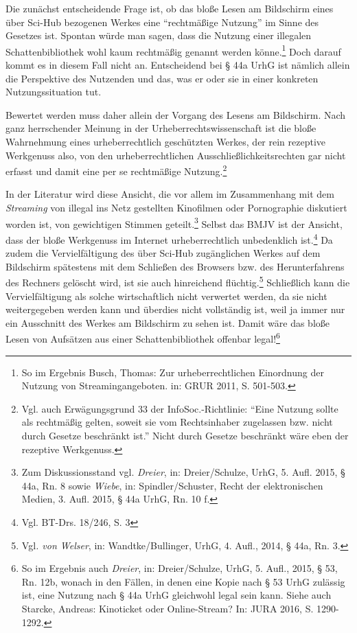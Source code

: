 \documentclass[a4paper,
fontsize=11pt,
oneside,
numbers=noperiodatend,
parskip=half-,
bibliography=totoc,
final
]{scrartcl}
\begin{document}
Die zunächst entscheidende Frage ist, ob das bloße Lesen am Bildschirm
eines über Sci-Hub bezogenen Werkes eine \enquote{rechtmäßige Nutzung}
im Sinne des Gesetzes ist. Spontan würde man sagen, dass die Nutzung
einer illegalen Schattenbibliothek wohl kaum rechtmäßig genannt werden
könne.\footnote{So im Ergebnis Busch, Thomas: Zur urheberrechtlichen
  Einordnung der Nutzung von Streamingangeboten. in: GRUR 2011, S.
  501-503.} Doch darauf kommt es in diesem Fall nicht an. Entscheidend
bei § 44a UrhG ist nämlich allein die Perspektive des Nutzenden und das,
was er oder sie in einer konkreten Nutzungssituation tut.

Bewertet werden muss daher allein der Vorgang des Lesens am Bildschirm.
Nach ganz herrschender Meinung in der Urheberrechtswissenschaft ist die
bloße Wahrnehmung eines urheberrechtlich geschützten Werkes, der rein
rezeptive Werkgenuss also, von den urheberrechtlichen
Ausschließlichkeitsrechten gar nicht erfasst und damit eine per se
rechtmäßige Nutzung.\footnote{Vgl. auch Erwägungsgrund 33 der
  InfoSoc.-Richtlinie: \enquote{Eine Nutzung sollte als rechtmäßig
  gelten, soweit sie vom Rechtsinhaber zugelassen bzw. nicht durch
  Gesetze beschränkt ist.} Nicht durch Gesetze beschränkt wäre eben der
  rezeptive Werkgenuss.}

In der Literatur wird diese Ansicht, die vor allem im Zusammenhang mit
dem \emph{Streaming} von illegal ins Netz gestellten Kinofilmen oder
Pornographie diskutiert worden ist, von gewichtigen Stimmen
geteilt.\footnote{Zum Diskussionsstand vgl. \emph{Dreier}, in:
  Dreier/Schulze, UrhG, 5. Aufl. 2015, § 44a, Rn. 8 sowie \emph{Wiebe},
  in: Spindler/Schuster, Recht der elektronischen Medien, 3. Aufl. 2015,
  § 44a UrhG, Rn. 10 f.} Selbst das BMJV ist der Ansicht, dass der bloße
Werkgenuss im Internet urheberrechtlich unbedenklich ist.\footnote{Vgl.
  BT-Drs. 18/246, S. 3} Da zudem die Vervielfältigung des über Sci-Hub
zugänglichen Werkes auf dem Bildschirm spätestens mit dem Schließen des
Browsers bzw. des Herunterfahrens des Rechners gelöscht wird, ist sie
auch hinreichend flüchtig.\footnote{Vgl\emph{. von Welser}, in:
  Wandtke/Bullinger, UrhG, 4. Aufl., 2014, § 44a, Rn. 3.} Schließlich
kann die Vervielfältigung als solche wirtschaftlich nicht verwertet
werden, da sie nicht weitergegeben werden kann und überdies nicht
vollständig ist, weil ja immer nur ein Ausschnitt des Werkes am
Bildschirm zu sehen ist. Damit wäre das bloße Lesen von Aufsätzen aus
einer Schattenbibliothek offenbar legal!\footnote{So im Ergebnis auch
  \emph{Dreier}, in: Dreier/Schulze, UrhG, 5. Aufl., 2015, § 53, Rn.
  12b, wonach in den Fällen, in denen eine Kopie nach § 53 UrhG zulässig
  ist, eine Nutzung nach § 44a UrhG gleichwohl legal sein kann. Siehe
  auch Starcke, Andreas: Kinoticket oder Online-Stream? In: JURA 2016,
  S. 1290-1292.}
\end{document}
